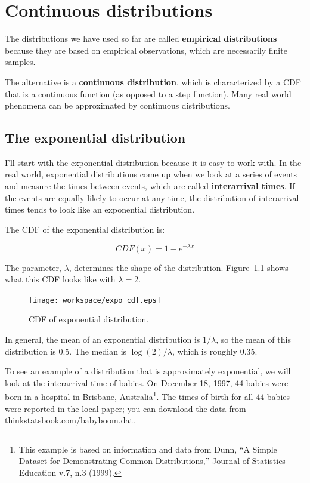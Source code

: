 \documentclass[12pt]{book}
\begin{document}
\chapter{Continuous distributions}
\label{continuous}

The distributions we have used so far are called {\bf
  empirical distributions} because they are based on empirical
observations, which are necessarily finite samples.

The alternative is a {\bf continuous distribution}, which is
characterized by a CDF that is a continuous function (as opposed to a
step function).  Many real world phenomena can be approximated by
continuous distributions.

\section{The exponential distribution}

I'll start with the exponential distribution because it is
easy to work with.  In the real world, exponential distributions
come up when we look at a series of events and measure the
times between events, which are called {\bf interarrival times}.
If the events are equally likely to occur at any time, the distribution
of interarrival times tends to look like an exponential distribution.

The CDF of the exponential distribution is:

\[ CDF(x) = 1 - e^{-\lambda x} \]

The parameter, $\lambda$, determines the shape of the
distribution.  Figure~\ref{expo_cdf} shows what this CDF looks like with
$\lambda = 2$.

\begin{figure}
\centerline{\texttt{[image: workspace/expo\_cdf.eps]}}
\caption{CDF of exponential distribution.}
\label{expo_cdf}
\end{figure}

In general, the mean of an exponential distribution is $1 / \lambda$,
so the mean of this distribution is 0.5.  The median is $\log(2) / \lambda$,
which is roughly 0.35.

To see an example of a distribution that is approximately exponential,
we will look at the interarrival time of babies.
On December 18, 1997, 44 babies were born in a hospital in Brisbane,
Australia\footnote{This example is based on information and data from
  Dunn, ``A Simple Dataset for Demonstrating Common Distributions,''
  Journal of Statistics Education v.7, n.3 (1999).}.  The times of
birth for all 44 babies were reported in the local paper; you can
download the data from \url{thinkstatsbook.com/babyboom.dat}.
\end{document}
